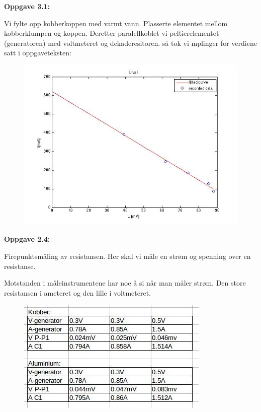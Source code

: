\documentclass[12pt,a4paper,leqno]{report}
\begin{document}
\textbf{Oppgave 3.1:}

Vi fylte opp kobberkoppen med varmt vann. Plasserte elementet mellom kobberklumpen og koppen. Deretter paralellkoblet vi peltierelementet (generatoren) med voltmeteret og dekaderesitoren. så tok vi mplinger for verdiene satt i oppgaveteksten:
\begin{figure}[H]
\caption{}
\centering
\includegraphics[width= \textwidth]{gjennomforing/oppgave31/lab1oppgave31.jpg}
\end{figure}
\textbf{Oppgave 2.4:} 

Firepunktsmåling av resistansen.
Her skal vi måle en strøm og spenning over en resistanse. 

Motstanden i måleinstrumentene har noe å si når man måler strøm. Den store resistansen i ameteret og den lille i voltmeteret.



\begin{figure}[H]
	\caption{}
	\centering
	\includegraphics[scale=1]{gjennomforing/oppgave4.jpg}
	\end{figure}
 
\end{document}
